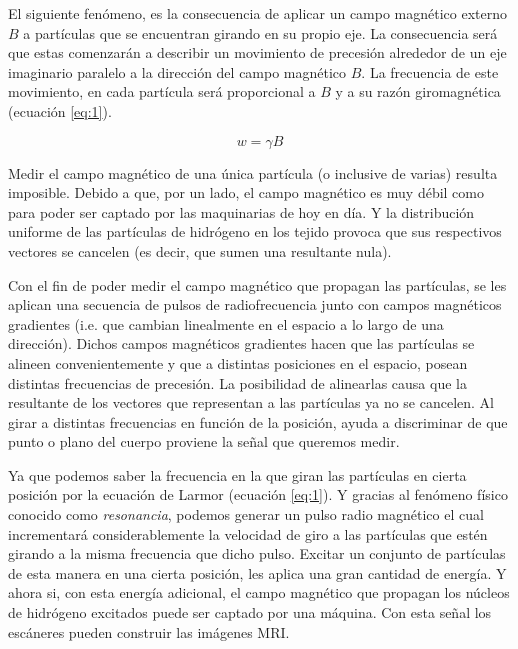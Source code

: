 El siguiente fen\'omeno, es la consecuencia de aplicar un campo magnético externo $B$ a partículas que se 
encuentran girando en su propio eje. La consecuencia será que estas comenzarán a describir un 
movimiento de precesi\'on alrededor de un eje imaginario paralelo a la direcci\'on del campo 
magnético $B$. La frecuencia de este movimiento, en cada part\'icula será proporcional a $B$ y a su 
razón giromagnética (ecuación \ref{eq:1}).

\begin{equation} 
\label{eq:1}
 w=\gamma  B
\end{equation}


Medir el campo magn\'etico de una \'unica part\'icula (o inclusive de varias) resulta imposible. 
Debido a que, por un lado, el campo magn\'etico es muy d\'ebil como para poder ser captado por las 
maquinarias de hoy en d\'ia. Y la distribuci\'on uniforme de las part\'iculas 
de hidr\'ogeno en los tejido provoca que sus respectivos vectores se cancelen (es decir, que sumen 
una resultante nula). 

Con el fin de poder medir el campo magnético que propagan las partículas, se les aplican una 
secuencia de pulsos de radiofrecuencia junto con campos magnéticos gradientes (i.e. que cambian 
linealmente en el espacio a lo largo de una direcci\'on). Dichos campos magn\'eticos gradientes 
hacen que las part\'iculas se alineen convenientemente y que a distintas posiciones en el espacio, 
posean distintas frecuencias de precesi\'on. La posibilidad de alinearlas causa que la resultante de 
los vectores que representan a las part\'iculas ya no se cancelen. Al girar a distintas 
frecuencias en funci\'on de la posici\'on, ayuda a discriminar de que punto o plano del cuerpo 
proviene la se\~nal que queremos medir.

Ya que podemos saber la frecuencia en la que giran las part\'iculas en cierta posici\'on por la
ecuación de Larmor (ecuación \ref{eq:1}). Y gracias al fen\'omeno f\'isico conocido como 
\textit{resonancia}, podemos generar un pulso radio magnético el cual 
incrementar\'a considerablemente la velocidad de giro a las part\'iculas que 
est\'en girando a la misma frecuencia que dicho pulso. Excitar un conjunto 
de part\'iculas de esta manera en una cierta posici\'on, les aplica una 
gran cantidad de energ\'ia. Y ahora si, con esta energía adicional, el campo 
magn\'etico que propagan los n\'ucleos de hidr\'ogeno excitados puede ser 
captado por una m\'aquina. Con esta se\~nal los escáneres pueden construir las 
im\'agenes MRI.


